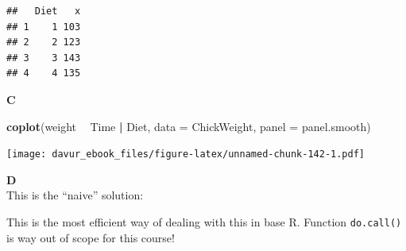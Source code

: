 \documentclass[]{book}
\newenvironment{Shaded}{\begin{snugshade}}{\end{snugshade}}
\newcommand{\CommentTok}[1]{\textcolor[rgb]{0.56,0.35,0.01}{\textit{#1}}}
\newcommand{\ControlFlowTok}[1]{\textcolor[rgb]{0.13,0.29,0.53}{\textbf{#1}}}
\newcommand{\DataTypeTok}[1]{\textcolor[rgb]{0.13,0.29,0.53}{#1}}
\newcommand{\DecValTok}[1]{\textcolor[rgb]{0.00,0.00,0.81}{#1}}
\newcommand{\KeywordTok}[1]{\textcolor[rgb]{0.13,0.29,0.53}{\textbf{#1}}}
\newcommand{\NormalTok}[1]{#1}
\newcommand{\OperatorTok}[1]{\textcolor[rgb]{0.81,0.36,0.00}{\textbf{#1}}}
\newcommand{\OtherTok}[1]{\textcolor[rgb]{0.56,0.35,0.01}{#1}}
\newcommand{\StringTok}[1]{\textcolor[rgb]{0.31,0.60,0.02}{#1}}
\begin{document}
\begin{verbatim}
##   Diet   x
## 1    1 103
## 2    2 123
## 3    3 143
## 4    4 135
\end{verbatim}

\textbf{C}

\begin{Shaded}
\begin{Highlighting}[]
\KeywordTok{coplot}\NormalTok{(weight }\OperatorTok{~}\StringTok{ }\NormalTok{Time }\OperatorTok{|}\StringTok{ }\NormalTok{Diet, }\DataTypeTok{data =}\NormalTok{ ChickWeight, }\DataTypeTok{panel =}\NormalTok{ panel.smooth)}
\end{Highlighting}
\end{Shaded}

\texttt{[image: davur\_ebook\_files/figure-latex/unnamed-chunk-142-1.pdf]}

\textbf{D}\\
This is the ``naive'' solution:

\begin{Shaded}
\end{Shaded}

This is the most efficient way of dealing with this in base R. Function \texttt{do.call()} is way out of scope for this course!
\end{document}
